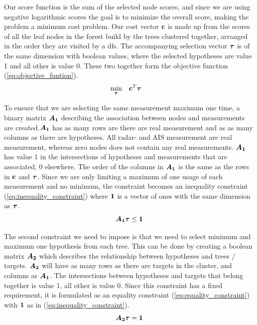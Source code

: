 Our score function is the sum of the selected node scores, and since we are using negative logarithmic scores the goal is to minimize the overall score, making the problem a minimum cost problem. Our cost vector \(\boldsymbol{\mathbf{c}}\) is made up from the scores of all the leaf nodes in the forest build by the trees clustered together, arranged in the order they are visited by a \gls{dfs}. The accompanying selection vector \( \boldsymbol{\mathbf{\tau}} \) is of the same dimension with boolean values, where the selected hypotheses are value 1 and all other is value 0. These two together form the objective function (\ref{eq:objective_funtion}).
\begin{equation}
\begin{aligned}
& \underset{\boldsymbol{\mathbf{\tau}}}{\text{min}}
& & \boldsymbol{\mathbf{c}}^T \boldsymbol{\mathbf{\tau}}
\end{aligned}
\label{eq:objective_funtion}
\end{equation}

To ensure that we are selecting the same measurement maximum one time, a binary matrix \( \bm{A_1} \) describing the association between nodes and measurements are created.\(\bm{A_1}\) has as many rows are there are real measurement and as as many columns as there are hypotheses. All radar- and AIS measurement are real measurement, whereas zero nodes does not contain any real measurements. \( \bm{A_1} \) has value 1 in the intersections of hypotheses and measurements that are associated, 0 elsewhere. The order of the columns in \( \bm{A_1} \) is the same as the rows in \( \boldsymbol{\mathbf{c}} \) and \( \boldsymbol{\mathbf{\tau}} \). Since we are only limiting a maximum of one usage of each measurement and no minimum, the constraint becomes an inequality constraint (\ref{eq:inequality_constraint}) where \( \boldsymbol{\mathbf{1}} \) is a vector of ones with the same dimension as \( \boldsymbol{\mathbf{\tau}} \).
\begin{equation}\label{eq:inequality_constraint}
\bm{A_1} \boldsymbol{\mathbf{\tau}} \leq \boldsymbol{\mathbf{1}}
\end{equation}

The second constraint we need to impose is that we need to select minimum and maximum one hypothesis from each tree. This can be done by creating a boolean matrix \( \bm{A_2} \) which describes the relationship between hypotheses and trees / targets. \( \bm{A_2} \) will have as many rows as there are targets in the cluster, and columns as \( \bm{A_1} \). The intersections between hypotheses and targets that belong together is value 1, all other is value 0. Since this constraint has a fixed requirement, it is formulated as an equality constraint (\ref{eq:equality_constraint}) with \( \boldsymbol{\mathbf{1}} \) as in (\ref{eq:inequality_constraint}).
\begin{equation}\label{eq:equality_constraint}
\bm{A_2} \boldsymbol{\mathbf{\tau}} = \boldsymbol{\mathbf{1}}
\end{equation}

